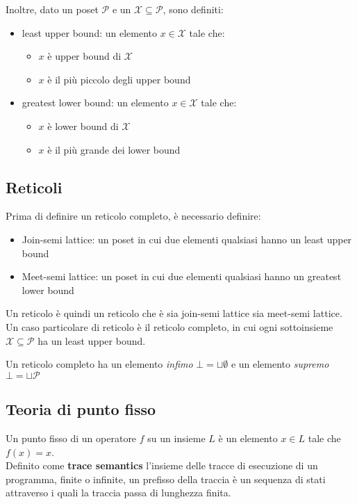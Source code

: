 \documentclass{article}[10pt]
\begin{document}
	Inoltre, dato un poset $\mathcal{P}$ e un $\mathcal{X} \subseteq \mathcal{P}$, sono definiti:
	\begin{itemize}
		\item least upper bound: un elemento $x \in \mathcal{X}$ tale che:
		\begin{itemize}
			\item $x$ è upper bound di $\mathcal{X}$
			\item $x$ è il più piccolo degli upper bound
		\end{itemize}
		\item greatest lower bound: un elemento $x \in \mathcal{X}$ tale che:
		\begin{itemize}
			\item $x$ è lower bound di $\mathcal{X}$
			\item $x$ è il più grande dei lower bound
		\end{itemize}
	\end{itemize}
	
	\subsection{Reticoli}
	Prima di definire un reticolo completo, è necessario definire:
	\begin{itemize}
		\item Join-semi lattice: un poset in cui due elementi qualsiasi hanno un least upper bound
		\item Meet-semi lattice: un poset in cui due elementi qualsiasi hanno un greatest lower bound
	\end{itemize}
	
	Un reticolo è quindi un reticolo che è sia join-semi lattice sia meet-semi lattice. Un caso particolare di reticolo è il reticolo completo, in cui ogni sottoinsieme $\mathcal{X} \subseteq \mathcal{P}$ ha un least upper bound.
	
	Un reticolo completo ha un elemento \textit{infimo} $\bot = \sqcup \emptyset$ e un elemento \textit{supremo} $\bot = \sqcup \mathcal{P}$
	
	\subsection{Teoria di punto fisso}
	Un punto fisso di un operatore $f$ su un insieme $L$ è un elemento $x \in L$ tale che $f(x)=x$. \\
	
	Definito come \textbf{trace semantics} l'insieme delle tracce di esecuzione di un programma, finite o infinite, un prefisso della traccia è un sequenza di stati attraverso i quali la traccia passa di lunghezza finita.
	
\end{document}
